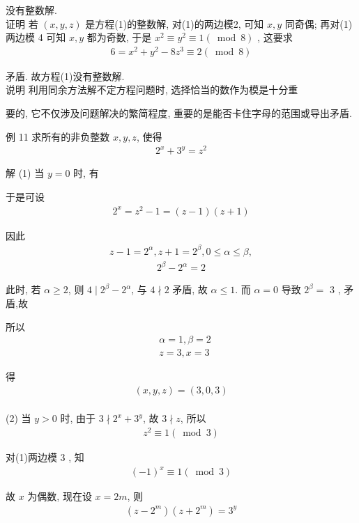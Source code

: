 	没有整数解.\\
	证明 若 $(x, y, z)$ 是方程(1)的整数解, 对(1)的两边模2, 可知 $x ,  y$ 同奇偶; 再对(1)两边模 4 可知 $x ,  y$ 都为奇数, 于是 $x^{2} \equiv y^{2} \equiv 1(\bmod 8)$ , 这要求
\begin{align*}
		6=x^{2}+y^{2}-8 z^{3} \equiv 2(\bmod 8)
	\end{align*}

	矛盾. 故方程(1)没有整数解.\\
	说明 利用同余方法解不定方程问题时, 选择恰当的数作为模是十分重

	要的, 它不仅涉及问题解决的繁简程度, 重要的是能否卡住字母的范围或导出矛盾.

	例 11 求所有的非负整数 $x ,  y ,  z$, 使得
\begin{align*}
		2^{x}+3^{y}=z^{2}
	\end{align*}

	解 (1) 当 $y=0$ 时, 有

	于是可设
\begin{align*}
		2^{x}=z^{2}-1=(z-1)(z+1)
	\end{align*}

	因此
\begin{align*}
		z-1=2^{\alpha}, z+1=2^{\beta}, 0 \leqslant \alpha \leqslant \beta,
	\end{align*}
\begin{align*}
		2^{\beta}-2^{\alpha}=2
	\end{align*}

	此时, 若 $\alpha \geqslant 2$, 则 $4 \mid 2^{\beta}-2^{\alpha}$, 与 $4 \nmid 2$ 矛盾, 故 $\alpha \leqslant 1$. 而 $\alpha=0$ 导致 $2^{\beta}=$ 3 , 矛盾,故

	所以\begin{align}
		 & \alpha=1, \beta=2 \\
		 & z=3, x=3
	\end{align}

	得
\begin{align*}
		(x, y, z)=(3,0,3)
	\end{align*}\\
	(2) 当 $y>0$ 时, 由于 $3 \nmid 2^{x}+3^{y}$, 故 $3 \nmid z$, 所以
\begin{align*}
		z^{2} \equiv 1(\bmod 3)
	\end{align*}

	对(1)两边模 3 , 知
\begin{align*}
		(-1)^{x} \equiv 1(\bmod 3)
	\end{align*}

	故 $x$ 为偶数, 现在设 $x=2 m$, 则
\begin{align*}
		\left(z-2^{m}\right)\left(z+2^{m}\right)=3^{y}
	\end{align*}

